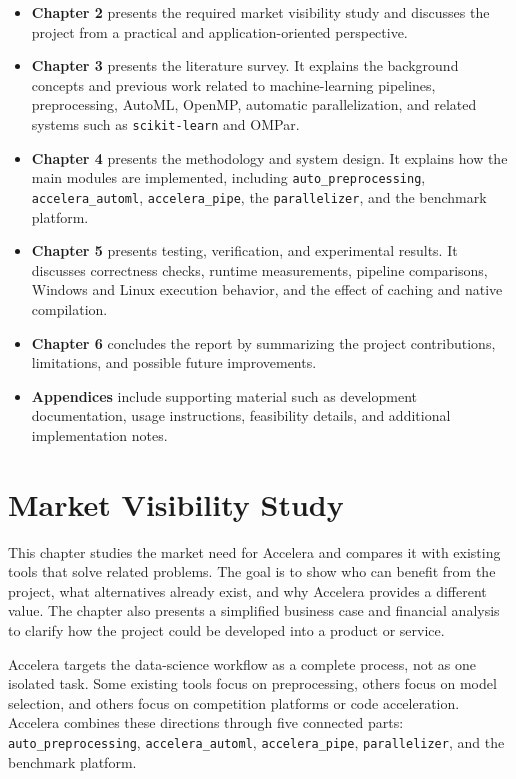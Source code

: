 \documentclass[12pt,a4paper]{report}
\begin{document}
\begin{itemize}
  \item \textbf{Chapter 2} presents the required market visibility study and
  discusses the project from a practical and application-oriented perspective.

  \item \textbf{Chapter 3} presents the literature survey. It explains the
  background concepts and previous work related to machine-learning pipelines,
  preprocessing, AutoML, OpenMP, automatic parallelization, and related systems
  such as \texttt{scikit-learn} and OMPar.

  \item \textbf{Chapter 4} presents the methodology and system design. It
  explains how the main modules are implemented, including
  \texttt{auto\_preprocessing}, \texttt{accelera\_automl},
  \texttt{accelera\_pipe}, the \texttt{parallelizer}, and the benchmark
  platform.

  \item \textbf{Chapter 5} presents testing, verification, and experimental
  results. It discusses correctness checks, runtime measurements, pipeline
  comparisons, Windows and Linux execution behavior, and the effect of caching
  and native compilation.

  \item \textbf{Chapter 6} concludes the report by summarizing the project
  contributions, limitations, and possible future improvements.

  \item \textbf{Appendices} include supporting material such as development
  documentation, usage instructions, feasibility details, and additional
  implementation notes.
\end{itemize}


\chapter{Market Visibility Study}
\label{chap:market-visibility}

This chapter studies the market need for Accelera and compares it with existing
tools that solve related problems. The goal is to show who can benefit from the
project, what alternatives already exist, and why Accelera provides a different
value. The chapter also presents a simplified business case and financial
analysis to clarify how the project could be developed into a product or service.

Accelera targets the data-science workflow as a complete process, not as one
isolated task. Some existing tools focus on preprocessing, others focus on model
selection, and others focus on competition platforms or code acceleration.
Accelera combines these directions through five connected parts:
\texttt{auto\_preprocessing}, \texttt{accelera\_automl},
\texttt{accelera\_pipe}, \texttt{parallelizer}, and the benchmark platform.
\end{document}
